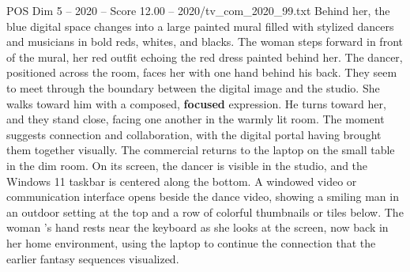 \begin{textsample}{POS Dim 5 – 2020 – Score 12.00 – 2020/tv\_com\_2020\_99.txt}
Behind her, the blue digital space changes into a large painted mural filled with stylized dancers and musicians in bold reds, whites, and blacks.
The woman steps forward in front of the mural, her red outfit echoing the red dress painted behind her.
The dancer, positioned across the room, faces her with one hand behind his back.
They seem to meet through the boundary between the digital image and the studio.
She walks toward him with a composed, \textbf{focused} expression.
He turns toward her, and they stand close, facing one another in the warmly lit room.
The moment suggests connection and collaboration, with the digital portal having brought them together visually.
The commercial returns to the laptop on the small table in the dim room.
On its screen, the dancer is visible in the studio, and the Windows 11 taskbar is centered along the bottom.
A windowed video or communication interface opens beside the dance video, showing a smiling man in an outdoor setting at the top and a row of colorful thumbnails or tiles below.
The woman ’s hand rests near the keyboard as she looks at the screen, now back in her home environment, using the laptop to continue the connection that the earlier fantasy sequences visualized.

\end{textsample}
